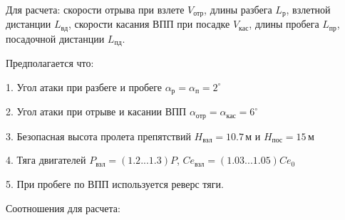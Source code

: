 Для расчета: скорости отрыва при взлете $V_{отр}$, длины разбега
$L_{р}$, взлетной дистанции
$L_{вд}$, скорости касания ВПП при посадке
$V_{кас}$, длины пробега
$L_{пр}$, посадочной дистанции
$L_{пд}$.

Предполагается что:

1. Угол атаки при разбеге и пробеге $\alpha_р = \alpha_{п} = 2^\circ$ 

2. Угол атаки при отрыве и касании ВПП $\alpha_{отр} = \alpha_{кас} = 6^\circ$

3. Безопасная высота пролета препятствий $H_{взл} = 10.7\, м$ и $H_{пос} = 15\, м$

4. Тяга двигателей $P_{взл} = (1.2 ... 1.3)P$, $Ce_{взл} = (1.03 ... 1.05) Ce_0$ 

5. При пробеге по ВПП используется реверс тяги.

Соотношения для расчета:


